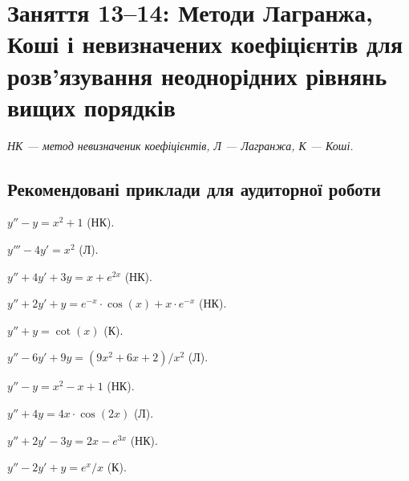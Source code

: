 \section*{Заняття 13--14: Методи Лагранжа, Коші і невизначених коефіцієнтів для розв'язування неоднорідних рівнянь вищих порядків}

\textit{НК --- метод невизначеник коефіцієнтів, Л --- Лагранжа, К --- Коші.}

\subsection*{Рекомендовані приклади для аудиторної роботи}

\begin{problem}
	$y'' - y = x^2 + 1$ (НК).
\end{problem}

\begin{problem}
	$y''' - 4 y' = x^2$ (Л).
\end{problem}

\begin{problem}
	$y'' + 4 y' + 3y = x + e^{2 x}$ (НК).
\end{problem}

\begin{problem}
	$y'' + 2 y' + y = e^{-x} \cdot \cos (x) + x \cdot e^{-x}$ (НК).
\end{problem}

\begin{problem}
	$y'' + y = \cot (x)$ (К).
\end{problem}

\begin{problem}
	$y'' - 6 y' + 9 y = (9 x^2 + 6 x + 2) / x^2$ (Л).
\end{problem}

\begin{problem}
	$y'' - y = x^2 - x + 1$ (НК).
\end{problem}

\begin{problem}
	$y'' + 4 y = 4 x \cdot \cos (2 x)$ (Л).
\end{problem}

\begin{problem}
	$y'' + 2 y' - 3 y = 2 x - e^{3 x}$ (НК).
\end{problem}

\begin{problem}
	$y'' - 2 y' + y = e^x / x$ (К).
\end{problem}

